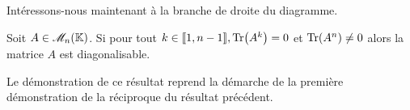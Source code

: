 Intéressons-nous maintenant à la branche de droite du diagramme.
\begin{prop}
    Soit $A \in \mathscr{M}_n(\mathbb{K})$. Si pour tout $k \in \llbracket 1, n-1 \rrbracket, \Tr(A^k) = 0$ et $\Tr(A^n) \not= 0$ alors la matrice $A$ est diagonalisable. 
\end{prop}
Le démonstration de ce résultat reprend la démarche de la première démonstration de la réciproque du résultat précédent.
\newcommand{\vandermondepartiel}{
\left(\begin{gathered}
    \tikzpicture[every node/.style={anchor=south west}]
        \node[minimum width=1.5cm,minimum height=0.5cm] at (0.125,1.25) {\LARGE $V_k$};
        
        \node[minimum width=0.5cm,minimum height=0.5cm] at (0,0) {$\star$};
        \node[minimum width=0.5cm,minimum height=0.5cm] at (0.55,0) {$\cdots$};
        \node[minimum width=0.5cm,minimum height=0.5cm] at (1.25,0) {$\star$};
        
        \node[minimum width=0.5cm,minimum height=0.5cm] at (0,0.375) {$\vdots$};
        \node[minimum width=0.5cm,minimum height=0.5cm] at (1.25,0.375) {$\vdots$};
        
        \node[minimum width=0.5cm,minimum height=0.5cm] at (0,0.75) {$\star$};
        \node[minimum width=0.5cm,minimum height=0.5cm] at (0.55,0.75) {$\cdots$};
        \node[minimum width=0.5cm,minimum height=0.5cm] at (1.25,0.75) {$\star$};

        \draw (0, 1.25) -- (1.75, 1.25);
    \endtikzpicture
    \end{gathered}\right)
}
